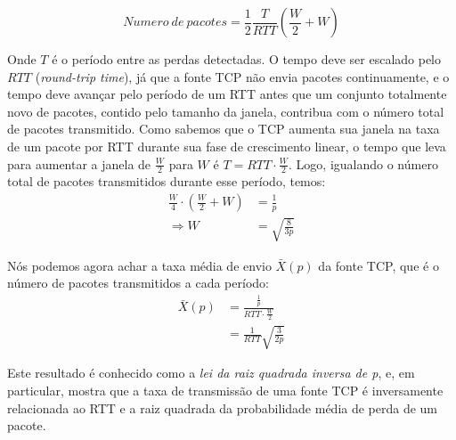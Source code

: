 \begin{equation}
Numero\ de\ pacotes = \frac{1}{2}\frac{T}{RTT}\left(\frac{W}{2} + W\right)
\end{equation}

Onde $T$ é o período entre as perdas detectadas. O tempo deve ser escalado pelo
$RTT$ (\textit{round-trip time}), já que a fonte TCP não envia pacotes
continuamente, e o tempo deve avançar pelo período de um RTT antes que um
conjunto totalmente novo de pacotes, contido pelo tamanho da janela, contribua
com o número total de pacotes transmitido. Como sabemos que o TCP aumenta sua
janela na taxa de um pacote por RTT durante sua fase de crescimento linear, o
tempo que leva para aumentar a janela de $\frac{W}{2}$ para $W$ é $T =
RTT \cdot \frac{W}{2}$. Logo, igualando o número total de pacotes transmitidos
durante esse período, temos:
\begin{align}
\frac{W}{4} \cdot \left(\frac{W}{2} + W\right) &= \frac{1}{p}\nonumber\\
\Rightarrow W &= \sqrt{\frac{8}{3p}}
\end{align}

Nós podemos agora achar a taxa média de envio $\bar{X}(p)$ da fonte TCP, que é o
número de pacotes transmitidos a cada período:
\begin{align}
\bar{X}(p) &= \frac{\frac{1}{p}}{RTT \cdot \frac{W}{2}}\nonumber\\
			&= \frac{1}{RTT} \sqrt{\frac{3}{2p}}
\end{align}

Este resultado é conhecido como a \textit{lei da raiz quadrada inversa de p}, e,
em particular, mostra que a taxa de transmissão de uma fonte TCP é inversamente
relacionada ao RTT e a raiz quadrada da probabilidade média de perda de um
pacote.
